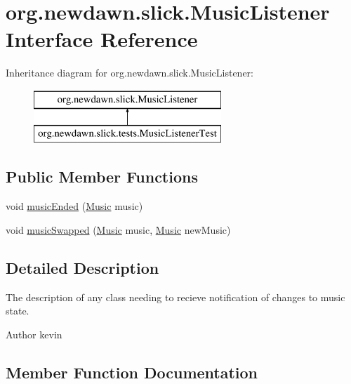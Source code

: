 \hypertarget{interfaceorg_1_1newdawn_1_1slick_1_1_music_listener}{}\section{org.\+newdawn.\+slick.\+Music\+Listener Interface Reference}
\label{interfaceorg_1_1newdawn_1_1slick_1_1_music_listener}
Inheritance diagram for org.\+newdawn.\+slick.\+Music\+Listener\+:\begin{figure}[H]
\begin{center}
\leavevmode
\includegraphics[height=2.000000cm]{interfaceorg_1_1newdawn_1_1slick_1_1_music_listener}
\end{center}
\end{figure}
\subsection*{Public Member Functions}
\begin{DoxyCompactItemize}
\item 
void \mbox{\hyperlink{interfaceorg_1_1newdawn_1_1slick_1_1_music_listener_af0d830c22b57e9d811d91e0e430b122e}{music\+Ended}} (\mbox{\hyperlink{classorg_1_1newdawn_1_1slick_1_1_music}{Music}} music)
\item 
void \mbox{\hyperlink{interfaceorg_1_1newdawn_1_1slick_1_1_music_listener_a29d640b90aae8c8de8a9bfe903eff2e3}{music\+Swapped}} (\mbox{\hyperlink{classorg_1_1newdawn_1_1slick_1_1_music}{Music}} music, \mbox{\hyperlink{classorg_1_1newdawn_1_1slick_1_1_music}{Music}} new\+Music)
\end{DoxyCompactItemize}


\subsection{Detailed Description}
The description of any class needing to recieve notification of changes to music state.

\begin{DoxyAuthor}{Author}
kevin 
\end{DoxyAuthor}


\subsection{Member Function Documentation}
\mbox{\label{interfaceorg_1_1newdawn_1_1slick_1_1_music_listener_af0d830c22b57e9d811d91e0e430b122e}} 
